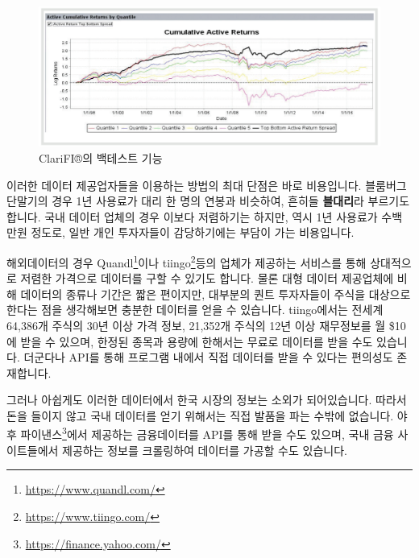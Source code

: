 \documentclass[]{book}
\let\rmarkdownfootnote\footnote%
\def\footnote{\protect\rmarkdownfootnote}
\begin{document}
\begin{figure}

{\centering \includegraphics{images/ClariFI_backtest} 

}

\caption{ClariFI®의 백테스트 기능}\label{fig:unnamed-chunk-2}
\end{figure}

이러한 데이터 제공업자들을 이용하는 방법의 최대 단점은 바로 비용입니다. 블룸버그 단말기의 경우 1년 사용료가 대리 한 명의 연봉과 비슷하여, 흔히들 \textbf{블대리}라 부르기도 합니다. 국내 데이터 업체의 경우 이보다 저렴하기는 하지만, 역시 1년 사용료가 수백 만원 정도로, 일반 개인 투자자들이 감당하기에는 부담이 가는 비용입니다.

해외데이터의 경우 Quandl\footnote{\url{https://www.quandl.com/}}이나 tiingo\footnote{\url{https://www.tiingo.com/}}등의 업체가 제공하는 서비스를 통해 상대적으로 저렴한 가격으로 데이터를 구할 수 있기도 합니다. 물론 대형 데이터 제공업체에 비해 데이터의 종류나 기간은 짧은 편이지만, 대부분의 퀀트 투자자들이 주식을 대상으로 한다는 점을 생각해보면 충분한 데이터를 얻을 수 있습니다. tiingo에서는 전세계 64,386개 주식의 30년 이상 가격 정보, 21,352개 주식의 12년 이상 재무정보를 월 \$10에 받을 수 있으며, 한정된 종목과 용량에 한해서는 무료로 데이터를 받을 수도 있습니다. 더군다나 API를 통해 프로그램 내에서 직접 데이터를 받을 수 있다는 편의성도 존재합니다.

그러나 아쉽게도 이러한 데이터에서 한국 시장의 정보는 소외가 되어있습니다. 따라서 돈을 들이지 않고 국내 데이터를 얻기 위해서는 직접 발품을 파는 수밖에 없습니다. 야후 파이낸스\footnote{\url{https://finance.yahoo.com/}}에서 제공하는 금융데이터를 API를 통해 받을 수도 있으며, 국내 금융 사이트들에서 제공하는 정보를 크롤링하여 데이터를 가공할 수도 있습니다.
\end{document}
